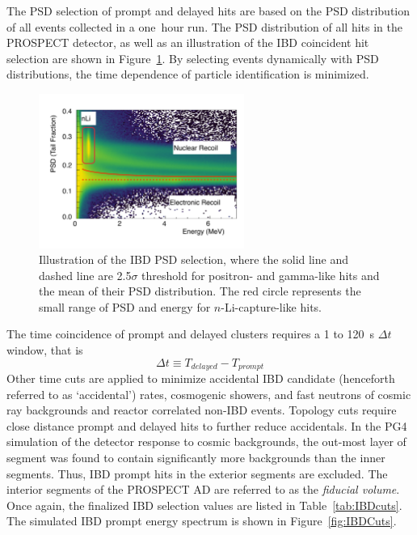 The PSD selection of prompt and delayed hits are based on the PSD distribution of all events collected in a one~hour run.
The PSD distribution of all hits in the PROSPECT detector, as well as an illustration of the IBD coincident hit selection are shown in Figure~\ref{fig:IBDPSD}.
By selecting events dynamically with PSD distributions, the time dependence of particle identification is minimized.
\begin{figure}[h!]
    \centering
    \includegraphics[width=0.6\textwidth]{Figures/IBDPSD.pdf}
    \caption[Illustration of IBD PSD selection]{Illustration of the IBD PSD selection, where the solid line and dashed line are 2.5$\sigma$ threshold for positron- and gamma-like hits and the mean of their PSD distribution.
    The red circle represents the small range of PSD and energy for $n$-Li-capture-like hits.}
    \label{fig:IBDPSD}
\end{figure}

The time coincidence of prompt and delayed clusters requires a 1 to 120~\textmu s $\Delta t$ window, that is 
\begin{equation}
\Delta t \equiv T_{delayed} - T_{prompt}
\end{equation}
Other time cuts are applied to minimize accidental IBD candidate (henceforth referred to as `accidental') rates, cosmogenic showers, and fast neutrons of cosmic ray backgrounds and reactor correlated non-IBD events.
Topology cuts require close distance prompt and delayed hits to further reduce accidentals. 
In the PG4 simulation of the detector response to cosmic backgrounds, the out-most layer of segment was found to contain significantly more backgrounds than the inner segments.
Thus, IBD prompt hits in the exterior segments are excluded.
The interior segments of the PROSPECT AD are referred to as the \textit{fiducial volume}.
Once again, the finalized IBD selection values are listed in Table~\ref{tab:IBDcuts}. 
The simulated IBD prompt energy spectrum is shown in Figure~\ref{fig:IBDCuts}.

